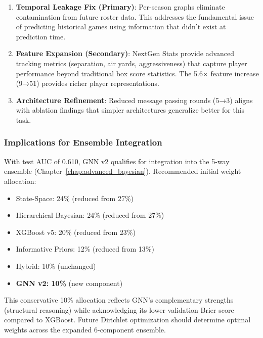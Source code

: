 \begin{enumerate}[noitemsep]
    \item \textbf{Temporal Leakage Fix (Primary)}: Per-season graphs eliminate contamination from future roster data. This addresses the fundamental issue of predicting historical games using information that didn't exist at prediction time.

    \item \textbf{Feature Expansion (Secondary)}: NextGen Stats provide advanced tracking metrics (separation, air yards, aggressiveness) that capture player performance beyond traditional box score statistics. The 5.6× feature increase (9→51) provides richer player representations.

    \item \textbf{Architecture Refinement}: Reduced message passing rounds (5→3) aligns with ablation findings that simpler architectures generalize better for this task.
\end{enumerate}

\subsubsection{Implications for Ensemble Integration}
\label{subsubsec:gnn_ensemble_implications}

With test AUC of 0.610, GNN v2 qualifies for integration into the 5-way ensemble (Chapter~\ref{chap:advanced_bayesian}). Recommended initial weight allocation:

\begin{itemize}[noitemsep]
    \item State-Space: 24\% (reduced from 27\%)
    \item Hierarchical Bayesian: 24\% (reduced from 27\%)
    \item XGBoost v5: 20\% (reduced from 23\%)
    \item Informative Priors: 12\% (reduced from 13\%)
    \item Hybrid: 10\% (unchanged)
    \item \textbf{GNN v2: 10\%} (new component)
\end{itemize}

This conservative 10\% allocation reflects GNN's complementary strengths (structural reasoning) while acknowledging its lower validation Brier score compared to XGBoost. Future Dirichlet optimization should determine optimal weights across the expanded 6-component ensemble.

